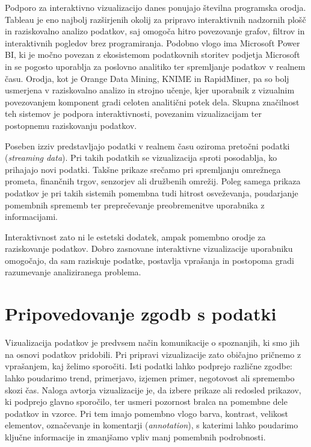 Podporo za interaktivno vizualizacijo danes ponujajo številna programska orodja. Tableau je eno najbolj razširjenih okolij za pripravo interaktivnih nadzornih plošč in raziskovalno analizo podatkov, saj omogoča hitro povezovanje grafov, filtrov in interaktivnih pogledov brez programiranja. Podobno vlogo ima Microsoft Power BI, ki je močno povezan z ekosistemom podatkovnih storitev podjetja Microsoft in se pogosto uporablja za poslovno analitiko ter spremljanje podatkov v realnem času. Orodja, kot je Orange Data Mining, KNIME in RapidMiner, pa so bolj usmerjena v raziskovalno analizo in strojno učenje, kjer uporabnik z vizualnim povezovanjem komponent gradi celoten analitični potek dela. Skupna značilnost teh sistemov je podpora interaktivnosti, povezanim vizualizacijam ter postopnemu raziskovanju podatkov.

Poseben izziv predstavljajo podatki v realnem času oziroma pretočni podatki (\emph{streaming data}). Pri takih podatkih se vizualizacija sproti posodablja, ko prihajajo novi podatki. Takšne prikaze srečamo pri spremljanju omrežnega prometa, finančnih trgov, senzorjev ali družbenih omrežij. Poleg samega prikaza podatkov je pri takih sistemih pomembna tudi hitrost osveževanja, poudarjanje pomembnih sprememb ter preprečevanje preobremenitve uporabnika z informacijami.

Interaktivnost zato ni le estetski dodatek, ampak pomembno orodje za raziskovanje podatkov. Dobro zasnovane interaktivne vizualizacije uporabniku omogočajo, da sam raziskuje podatke, postavlja vprašanja in postopoma gradi razumevanje analiziranega problema.


\section{Pripovedovanje zgodb s podatki}

Vizualizacija podatkov je predvsem način komunikacije o spoznanjih, ki smo jih na osnovi podatkov pridobili. Pri pripravi vizualizacije zato običajno pričnemo z vprašanjem, kaj želimo sporočiti. Isti podatki lahko podprejo različne zgodbe: lahko poudarimo trend, primerjavo, izjemen primer, negotovost ali spremembo skozi čas. Naloga avtorja vizualizacije je, da izbere prikaze ali redosled prikazov, ki podprejo glavno sporočilo, ter usmeri pozornost bralca na pomembne dele podatkov in vzorce. Pri tem imajo pomembno vlogo barva, kontrast, velikost elementov, označevanje in komentarji (\emph{annotation}), s katerimi lahko poudarimo ključne informacije in zmanjšamo vpliv manj pomembnih podrobnosti.

